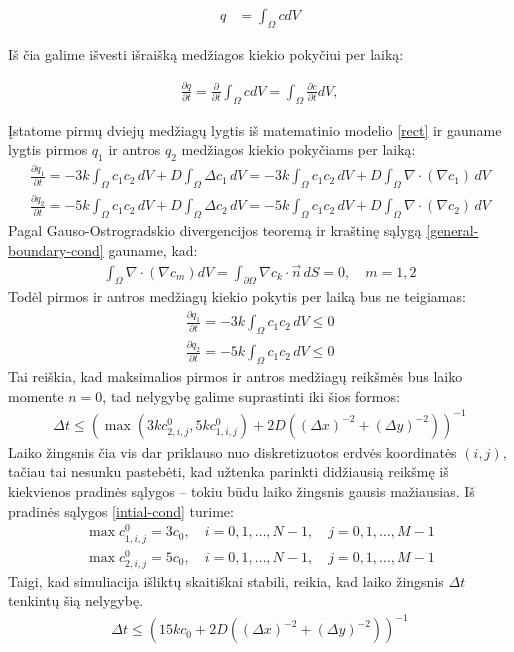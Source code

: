 \begin{align}
  q&=\int_\Omega c dV \label{quantity-general}
\end{align}

Iš čia galime išvesti išraišką medžiagos kiekio pokyčiui per laiką:

\begin{align}
  \frac{\partial q}{\partial t}=\frac{\partial}{\partial t}\int_\Omega c dV=\int_\Omega\frac{\partial c}{\partial t}dV,
\end{align}

Įstatome pirmų dviejų medžiagų lygtis iš matematinio modelio \eqref{rect} ir gauname lygtis pirmos $q_1$ ir antros $q_2$ medžiagos kiekio pokyčiams per laiką:
\begin{align}
  \frac{\partial q_1}{\partial t}=-3k\int_\Omega c_1c_2\,dV + D\int_\Omega \Delta c_1\,dV=-3k\int_\Omega c_1c_2\,dV + D\int_\Omega \nabla \cdot (\nabla c_1)\,dV\\
  \frac{\partial q_2}{\partial t}=-5k\int_\Omega c_1c_2\,dV + D\int_\Omega \Delta c_2\,dV=-5k\int_\Omega c_1c_2\,dV + D\int_\Omega \nabla \cdot (\nabla c_2)\,dV
\end{align}
\newpage
Pagal Gauso-Ostrogradskio divergencijos teoremą ir kraštinę sąlygą \eqref{general-boundary-cond} gauname, kad:
\begin{align}\label{no-q-change}
\int_\Omega \nabla \cdot (\nabla c_m) dV = \int_{\partial\Omega} \nabla c_k \cdot \vec{n}\, dS = 0,\quad m=1,2
\end{align}
Todėl pirmos ir antros medžiagų kiekio pokytis per laiką bus ne teigiamas:
\begin{subequations} \label{negative-quantity}
\begin{align}
  \frac{\partial q_1}{\partial t}=-3k\int_\Omega c_1c_2\,dV \leqslant 0\\
  \frac{\partial q_2}{\partial t}=-5k\int_\Omega c_1c_2\,dV\leqslant 0
\end{align}
\end{subequations}
Tai reiškia, kad maksimalios pirmos ir antros medžiagų reikšmės bus laiko momente $n=0$, tad nelygybę galime suprastinti iki šios formos:
\begin{align}
  \Delta t \leqslant \left(\max(3kc^{0}_{2,i,j}, 5kc^{0}_{1,i,j})+2D\left((\Delta x)^{-2}+(\Delta y)^{-2}\right)\right)^{-1}
\end{align}
Laiko žingsnis čia vis dar priklauso nuo diskretizuotos erdvės koordinatės $(i, j)$, tačiau tai nesunku pastebėti, kad užtenka parinkti didžiausią reikšmę iš kiekvienos pradinės sąlygos -- tokiu būdu laiko žingsnis gausis mažiausias. Iš pradinės sąlygos \eqref{intial-cond} turime:
\begin{align*}
\max c^0_{1,i,j}=3c_0,\quad i=0,1,\dots,N-1, \quad j=0,1,\dots,M-1\\
\max c^0_{2,i,j}=5c_0,\quad i=0,1,\dots,N-1, \quad j=0,1,\dots,M-1
\end{align*}
Taigi, kad simuliacija išliktų skaitiškai stabili, reikia, kad laiko žingsnis $\Delta t$ tenkintų šią nelygybę.
\begin{align}
  \Delta t \leqslant \left(15kc_0+2D\left((\Delta x)^{-2}+(\Delta y)^{-2}\right)\right)^{-1}\label{numerical-stability-condition}
\end{align}

